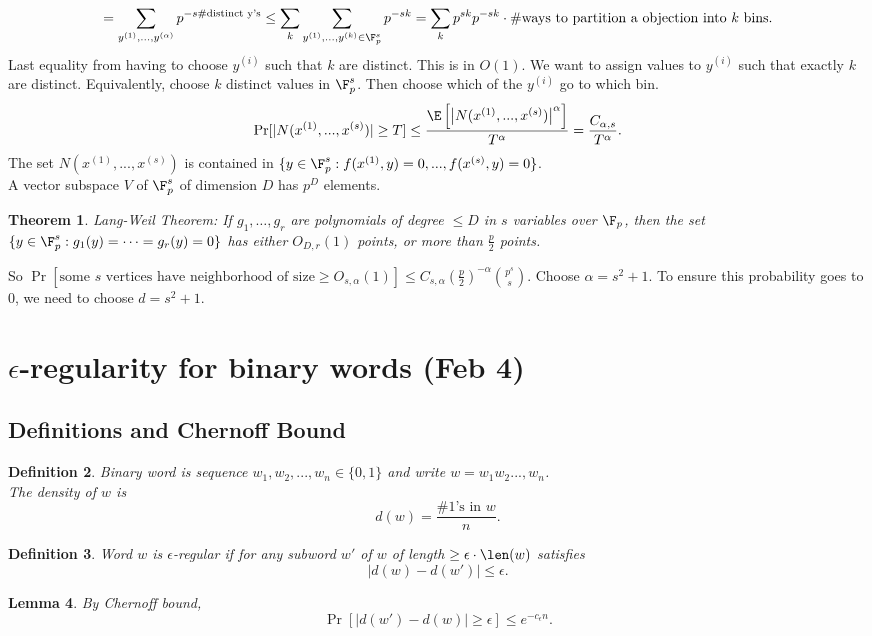 \documentclass[a4paper]{article}
\newtheorem{thm}{Theorem}[section]
\newtheorem{lem}[thm]{Lemma}
\newtheorem{defn}[thm]{Definition}
\begin{document}
    \[
    =\sum_{y^{(1)},...,y^{(\alpha)}} p^{-s\# \text{distinct y's}} \leq \sum_{k}\sum_{y^{(1)},...,y^{(k)}\in \F_p^s} p^{-sk}=\sum_{k}p^{sk}p^{-sk} \cdot \# \text{ways to partition a objection into $k$ bins}
    .\] 
    Last equality from having to choose $y^{(i)}$ such that $k$ are distinct. This is in $O(1)$. 
    We want to assign values to $y^{(i)}$ such that exactly $k$ are distinct. Equivalently, choose $k$ distinct values in $\F_p^s$. Then choose which of the $y^{(i)}$ go to which bin. 
    \[
    \Pr[|N(x^{(1)},...,x^{(s)})|\geq T] \leq \frac{\E\left [\left |N(x^{(1)},...,x^{(s)}) \right |^\alpha \right ]}{T^\alpha}=\frac{C_{\alpha,s}}{T^\alpha}
    .\] 
    The set $N(x^{(1)},...,x^{(s)})$ is contained in $\{y\in \F_p^s: f(x^{(1)},y)=0,...,f(x^{(s)},y)=0\}$. \\
    A vector subspace $V$ of $\F_p^s$ of dimension $D$ has $p^D$ elements. 
    \begin{thm}
        Lang-Weil Theorem: If $g_1,\ldots,g_r$ are polynomials of degree $\leq D$ in $s$ variables over $\F_p$, then the set $\{y \in \F_p^s : g_1(y) = \cdots = g_r(y) = 0\}$ has either $O_{D,r}(1)$ points, or more than $\frac{p}{2}$ points.
    \end{thm}
    \noindent So $\Pr\left[\text{some $s$ vertices have neighborhood of size} \geq O_{s,\alpha}(1)\right] \leq C_{s,\alpha} \left(\frac{p}{2}\right)^{-\alpha} {p^s \choose s}.$ 
    Choose $\alpha = s^2 + 1$. To ensure this probability goes to $0$, we need to choose $d = s^2 + 1.$
\newpage
\section{$\epsilon$-regularity for binary words (Feb 4)}

\subsection{Definitions and Chernoff Bound}
\begin{defn}
    Binary word is sequence $w_1,w_2,...,w_n\in \{0, 1\}$ and write $w=w_1w_2...,w_n$.\\
    The density of $w$ is \[
    d(w)=\frac{\# \text{$1$'s in $w$}}{n}
    .\] 
\end{defn}
\begin{defn}
    Word $w$ is $\epsilon$-regular if for any subword $w'$ of $w$ of length $\geq \epsilon \cdot \len(w)$ satisfies \[
    |d(w)-d(w')|\leq \epsilon
    .\] 
\end{defn}
\begin{lem}
    By Chernoff bound, \[
    \Pr[|d(w')-d(w)|\geq \epsilon]\leq e^{-c_\epsilon n}
    .\] 
\end{lem}
\end{document}
